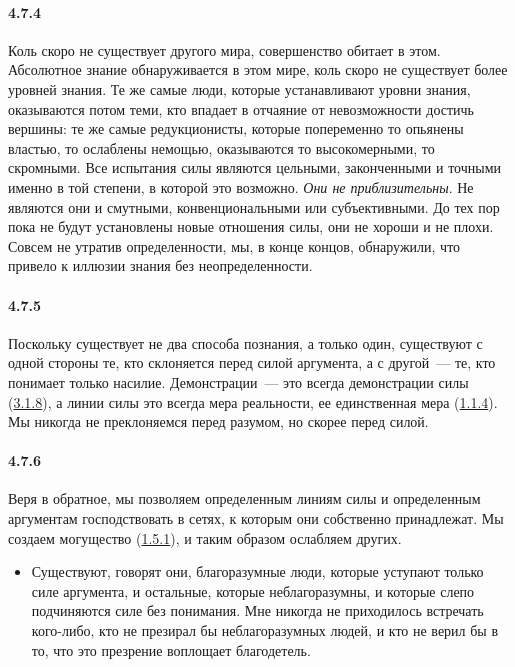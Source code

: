 \paragraph{4.7.4}\hypertarget{par:4.7.4}{} Коль скоро не существует другого мира, совершенство обитает в этом. Абсолютное знание обнаруживается в этом мире, коль скоро не существует более уровней знания. Те же самые люди, которые устанавливают уровни знания, оказываются потом теми, кто впадает в отчаяние от невозможности достичь вершины: те же самые редукционисты, которые попеременно то опьянены властью, то ослаблены немощью, оказываются то высокомерными, то скромными. Все испытания силы являются цельными, законченными и точными именно в той степени, в которой это возможно. {\itshape Они не приблизительны}. Не являются они и смутными, конвенциональными или субъективными. До тех пор пока не будут установлены новые отношения силы, они не хороши и не плохи. Совсем не утратив определенности, мы, в конце концов, обнаружили, что привело к иллюзии знания без неопределенности.


\paragraph{4.7.5}\hypertarget{par:4.7.5}{} Поскольку существует не два способа познания, а только один, существуют с одной стороны те, кто склоняется перед силой аргумента, а с другой~--- те, кто понимает только насилие. Демонстрации~--- это всегда демонстрации силы (\hyperlink{par:3.1.8}{3.1.8}), а линии силы это всегда мера реальности, ее единственная мера (\hyperlink{par:1.1.4}{1.1.4}). Мы никогда не преклоняемся перед разумом, но скорее перед силой.


\paragraph{4.7.6}\hypertarget{par:4.7.6}{} Веря в обратное, мы позволяем определенным линиям силы и определенным аргументам господствовать в сетях, к которым они собственно принадлежат. Мы создаем могущество (\hyperlink{par:1.5.1}{1.5.1}), и таким образом ослабляем других. 
	\begin{itemize}
	\item 
	Существуют, говорят они, благоразумные люди, которые уступают только силе аргумента, и остальные, которые неблагоразумны, и которые слепо подчиняются силе без понимания. Мне никогда не приходилось встречать кого-либо, кто не презирал бы неблагоразумных людей, и кто не верил бы в то, что это презрение воплощает благодетель.
	\end{itemize}

